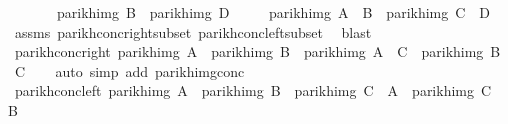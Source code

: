 \begin{isabellebody}
\ \ \ \ \ \ \ {\isachardoublequoteopen}parikh{\isacharunderscore}{\kern0pt}img\ B\ {\isasymsubseteq}\ parikh{\isacharunderscore}{\kern0pt}img\ D{\isachardoublequoteclose}\isanewline
\ \ \ \ \ {\isachardoublequoteopen}parikh{\isacharunderscore}{\kern0pt}img\ {\isacharparenleft}{\kern0pt}A\ {\isacharat}{\kern0pt}{\isacharat}{\kern0pt}\ B{\isacharparenright}{\kern0pt}\ {\isasymsubseteq}\ parikh{\isacharunderscore}{\kern0pt}img\ {\isacharparenleft}{\kern0pt}C\ {\isacharat}{\kern0pt}{\isacharat}{\kern0pt}\ D{\isacharparenright}{\kern0pt}{\isachardoublequoteclose}\isanewline
%
\isadelimproof
\ \ %
\endisadelimproof
%
\isatagproof
{}\isamarkupfalse%
\ assms\ parikh{\isacharunderscore}{\kern0pt}conc{\isacharunderscore}{\kern0pt}right{\isacharunderscore}{\kern0pt}subset\ parikh{\isacharunderscore}{\kern0pt}conc{\isacharunderscore}{\kern0pt}left{\isacharunderscore}{\kern0pt}subset\ \isamarkupfalse%
\ blast%
\endisatagproof
{\isafoldproof}%
%
\isadelimproof
\isanewline
%
\endisadelimproof
\isanewline
{}\isamarkupfalse%
\ parikh{\isacharunderscore}{\kern0pt}conc{\isacharunderscore}{\kern0pt}right{\isacharcolon}{\kern0pt}\ {\isachardoublequoteopen}parikh{\isacharunderscore}{\kern0pt}img\ A\ {\isacharequal}{\kern0pt}\ parikh{\isacharunderscore}{\kern0pt}img\ B\ {\isasymLongrightarrow}\ parikh{\isacharunderscore}{\kern0pt}img\ {\isacharparenleft}{\kern0pt}A\ {\isacharat}{\kern0pt}{\isacharat}{\kern0pt}\ C{\isacharparenright}{\kern0pt}\ {\isacharequal}{\kern0pt}\ parikh{\isacharunderscore}{\kern0pt}img\ {\isacharparenleft}{\kern0pt}B\ {\isacharat}{\kern0pt}{\isacharat}{\kern0pt}\ C{\isacharparenright}{\kern0pt}{\isachardoublequoteclose}\isanewline
%
\isadelimproof
\ \ %
\endisadelimproof
%
\isatagproof
{}\isamarkupfalse%
\ {\isacharparenleft}{\kern0pt}auto\ simp\ add{\isacharcolon}{\kern0pt}\ parikh{\isacharunderscore}{\kern0pt}img{\isacharunderscore}{\kern0pt}conc{\isacharparenright}{\kern0pt}%
\endisatagproof
{\isafoldproof}%
%
\isadelimproof
\isanewline
%
\endisadelimproof
\isanewline
{}\isamarkupfalse%
\ parikh{\isacharunderscore}{\kern0pt}conc{\isacharunderscore}{\kern0pt}left{\isacharcolon}{\kern0pt}\ {\isachardoublequoteopen}parikh{\isacharunderscore}{\kern0pt}img\ A\ {\isacharequal}{\kern0pt}\ parikh{\isacharunderscore}{\kern0pt}img\ B\ {\isasymLongrightarrow}\ parikh{\isacharunderscore}{\kern0pt}img\ {\isacharparenleft}{\kern0pt}C\ {\isacharat}{\kern0pt}{\isacharat}{\kern0pt}\ A{\isacharparenright}{\kern0pt}\ {\isacharequal}{\kern0pt}\ parikh{\isacharunderscore}{\kern0pt}img\ {\isacharparenleft}{\kern0pt}C\ {\isacharat}{\kern0pt}{\isacharat}{\kern0pt}\ B{\isacharparenright}{\kern0pt}{\isachardoublequoteclose}\isanewline

\end{isabellebody}
